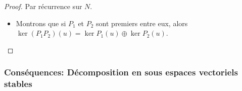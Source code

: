 \begin{proof}
	Par récurrence sur $N$.

	\begin{itemize}
		\item Montrons que si $P_1$ et $P_2$ sont premiers entre eux, alors $\ker (P_1P_2) (u) = \ker P_1(u) \oplus \ker P_2(u)$.\\
	\end{itemize}
\end{proof}


\subsubsection{Conséquences: Décomposition en sous espaces vectoriels stables}

